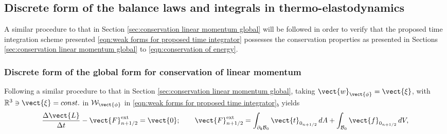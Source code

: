 {{%

\subsection{Discrete form of the balance laws and integrals in thermo-elastodynamics}\label{sec:discrete conservation properties}

A similar procedure to that in Section \ref{sec:conservation linear momentum global} will be followed in order to verify that the proposed time integration scheme presented \eqref{eqn:weak forms for proposed time integrator} possesses the conservation properties as presented in Sections \ref{sec:conservation linear momentum global} to \ref{eqn:conservation of energy}.


\subsubsection{Discrete form of the global form for conservation of linear momentum}\label{sec:discrete form linear momentum}

Following a similar procedure to that in Section \ref{sec:conservation linear momentum global}, taking $\vect{w}_{\vect{\phi}} = \vect{\xi}$, with $\mathbb{R}^3\ni\vect{\xi}=const.$ in $\mathcal{W}_{\vect{\phi}}$ in \eqref{eqn:weak forms for proposed time integrator}$_b$ yields
%
\begin{equation}\label{eqn:global conservation linear momentum discrete}
%
\frac{\Delta\vect{L}}{\Delta t} - \vect{F}_{n+1/2}^{\text{ext}} = \vect{0};\qquad
%
\vect{F}^{\text{ext}}_{n+1/2} =    
\int_{\partial_{\boldsymbol{t}}\mathcal{B}_0}\vect{t}_{0_{n+1/2}}\,dA
+\int_{\mathcal{B}_0}\vect{f}_{0_{n+1/2}}\,dV,
\end{equation}
%
%

}}
